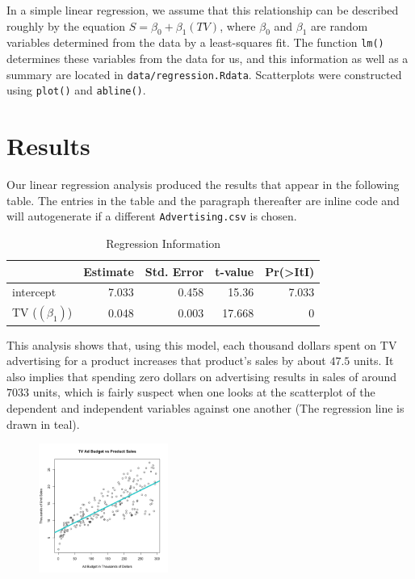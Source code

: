 \documentclass{article}
\begin{document}
In a simple linear regression, we assume that this relationship can be described roughly by the equation $S = \beta_0+\beta_1(TV)$, where $\beta_0$ and $\beta_1$ are random variables determined from the data by a least-squares fit. The function \texttt{lm()} determines these variables from the data for us, and this information as well as a summary are located in \texttt{data/regression.Rdata}.  Scatterplots were constructed using \texttt{plot()} and \texttt{abline()}.

\section{Results}

Our linear regression analysis produced the results that appear in the following table. The entries in the table and the paragraph thereafter are inline code and will autogenerate if a different \texttt{Advertising.csv} is chosen. \\

\begin{table}[ht]
\centering
\begin{tabular}{|l|r|r|r|r|}
 & Estimate & Std. Error & t-value & Pr(>ItI) \\ \hline
intercept & 7.033 & 0.458 & 15.36 & 7.033 \\
TV ($(\beta_1)$) & 0.048 & 0.003 & 17.668 & 0\\
\end{tabular}
\caption{Regression Information}
\end{table}

This analysis shows that, using this model, each thousand dollars spent on TV advertising for a product increases that product's sales by about $47.5$ units.  It also implies that spending zero dollars on advertising results in sales of around $7033$ units, which is fairly suspect when one looks at the scatterplot of the dependent and independent variables against one another (The regression line is drawn in teal).

\begin{figure}[!ht]
\centering
\includegraphics[width=160px]{../images/scatterplot-tv-sales.png}
\label{fig:scatterplot}
\end{figure}
\end{document}
